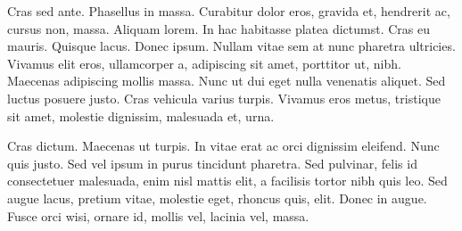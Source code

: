 Cras sed ante. Phasellus in massa. Curabitur dolor eros, gravida et, hendrerit ac, cursus non, massa. Aliquam lorem. In hac habitasse platea dictumst. Cras eu mauris. Quisque lacus. Donec ipsum. Nullam vitae sem at nunc pharetra ultricies. Vivamus elit eros, ullamcorper a, adipiscing sit amet, porttitor ut, nibh. Maecenas adipiscing mollis massa. Nunc ut dui eget nulla venenatis aliquet. Sed luctus posuere justo. Cras vehicula varius turpis. Vivamus eros metus, tristique sit amet, molestie dignissim, malesuada et, urna.

Cras dictum. Maecenas ut turpis. In vitae erat ac orci dignissim eleifend. Nunc quis justo. Sed vel ipsum in purus tincidunt pharetra. Sed pulvinar, felis id consectetuer malesuada, enim nisl mattis elit, a facilisis tortor nibh quis leo. Sed augue lacus, pretium vitae, molestie eget, rhoncus quis, elit. Donec in augue. Fusce orci wisi, ornare id, mollis vel, lacinia vel, massa.


